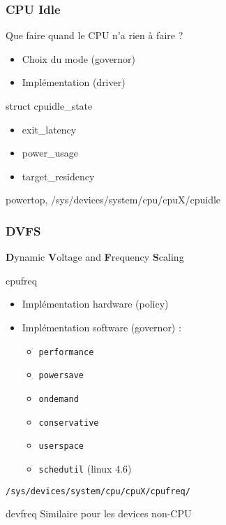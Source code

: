 \begin{frame}
	\frametitle{CPU Idle}
	\begin{block}{Que faire quand le CPU n'a rien à faire ?}
	\begin{itemize}
		\item Choix du mode (governor)
		\item Implémentation (driver)
	\end{itemize}
	\end{block}
	\begin{block}{struct cpuidle\_state}
		\begin{itemize}
			\item exit\_latency
			\item power\_usage
			\item target\_residency
		\end{itemize}
	\end{block}
	powertop, /sys/devices/system/cpu/cpuX/cpuidle
\end{frame}

\begin{frame}
	\frametitle{DVFS}
	\textbf{D}ynamic \textbf{V}oltage and \textbf{F}requency \textbf{S}caling
	\begin{block}{cpufreq}
		\begin{itemize}
			\item Implémentation hardware (policy)
			\item Implémentation software (governor) :
				\begin{itemize}
					\item \texttt{performance}
					\item \texttt{powersave}
					\item \texttt{ondemand}
					\item \texttt{conservative}
					\item \texttt{userspace}
					\item \texttt{schedutil} (linux 4.6)
				\end{itemize}
		\end{itemize}
		\texttt{/sys/devices/system/cpu/cpuX/cpufreq/}
	\end{block}
	\begin{block}{devfreq}
		Similaire pour les devices non-CPU
	\end{block}
\end{frame}

